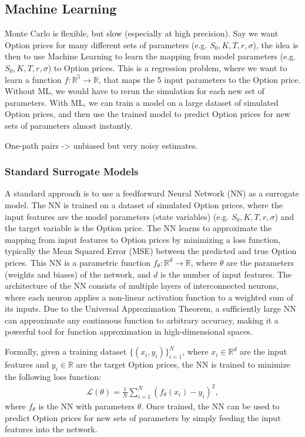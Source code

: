 \subsection{Machine Learning}

Monte Carlo is flexible, but slow (especially at high precision). Say we want Option prices for many different sets of parameters (e.g. $S_0, K, T, r, \sigma$), the idea is then to use Machine Learning to learn the mapping from model parameters (e.g. $S_0, K, T, r, \sigma$) to Option prices. This is a regression problem, where we want to learn a function $f: \mathbb{R}^5 \to \mathbb{R}$, that maps the 5 input parameters to the Option price. Without ML, we would have to rerun the simulation for each new set of parameters. With ML, we can train a model on a large dataset of simulated Option prices, and then use the trained model to predict Option prices for new sets of parameters almost instantly. 

One-path pairs -> unbiased but very noisy estimates. 

\subsubsection{Standard Surrogate Models}

A standard approach is to use a feedforward Neural Network (NN) as a surrogate model. The NN is trained on a dataset of simulated Option prices, where the input features are the model parameters (state variables) (e.g. $S_0, K, T, r, \sigma$) and the target variable is the Option price. The NN learns to approximate the mapping from input features to Option prices by minimizing a loss function, typically the Mean Squared Error (MSE) between the predicted and true Option prices. This NN is a parametric function $f_\theta: \mathbb{R}^d \to \mathbb{R}$, where $\theta$ are the parameters (weights and biases) of the network, and $d$ is the number of input features. The architecture of the NN consists of multiple layers of interconnected neurons, where each neuron applies a non-linear activation function to a weighted sum of its inputs. Due to the Universal Approximation Theorem, a sufficiently large NN can approximate any continuous function to arbitrary accuracy, making it a powerful tool for function approximation in high-dimensional spaces. 

Formally, given a training dataset $\{(x_i, y_i)\}_{i=1}^N$, where $x_i \in \mathbb{R}^d$ are the input features and $y_i \in \mathbb{R}$ are the target Option prices, the NN is trained to minimize the following loss function:
\begin{align} \label{eq:NN_mse_loss}
    \mathcal{L}(\theta) = \frac{1}{N} \sum_{i=1}^N (f_\theta(x_i) - y_i)^2,
\end{align}
where $f_\theta$ is the NN with parameters $\theta$. Once trained, the NN can be used to predict Option prices for new sets of parameters by simply feeding the input features into the network.

